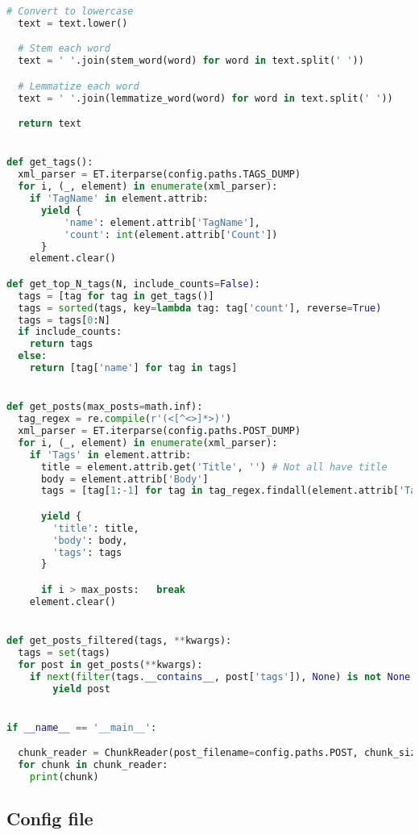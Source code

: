 \begin{lstlisting}[language=python]
  # Convert to lowercase
  text = text.lower()

  # Stem each word
  text = ' '.join(stem_word(word) for word in text.split(' '))

  # Lemmatize each word
  text = ' '.join(lemmatize_word(word) for word in text.split(' '))

  return text


def get_tags():
  xml_parser = ET.iterparse(config.paths.TAGS_DUMP)
  for i, (_, element) in enumerate(xml_parser):
    if 'TagName' in element.attrib:
      yield {
          'name': element.attrib['TagName'],
          'count': int(element.attrib['Count'])
      }
    element.clear()

def get_top_N_tags(N, include_counts=False):
  tags = [tag for tag in get_tags()]
  tags = sorted(tags, key=lambda tag: tag['count'], reverse=True)
  tags = tags[0:N]
  if include_counts:
    return tags
  else:
    return [tag['name'] for tag in tags]


def get_posts(max_posts=math.inf):
  tag_regex = re.compile(r'(<[^<>]*>)')
  xml_parser = ET.iterparse(config.paths.POST_DUMP)
  for i, (_, element) in enumerate(xml_parser):
    if 'Tags' in element.attrib:
      title = element.attrib.get('Title', '') # Not all have title
      body = element.attrib['Body']
      tags = [tag[1:-1] for tag in tag_regex.findall(element.attrib['Tags'])]

      yield {
        'title': title,
        'body': body,
        'tags': tags
      }

      if i > max_posts:   break
    element.clear()


def get_posts_filtered(tags, **kwargs):
  tags = set(tags)
  for post in get_posts(**kwargs):
    if next(filter(tags.__contains__, post['tags']), None) is not None:
        yield post


if __name__ == '__main__':

  chunk_reader = ChunkReader(post_filename=config.paths.POST, chunk_size=1024)
  for chunk in chunk_reader:
    print(chunk)
\end{lstlisting}


\subsection{Config file}
\label{app:config}

